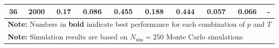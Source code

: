 \begin{landscape}
\begin{table}[p]
\begin{tabular}{cccccccccc}
	 36  & 2000 &        0.17        & 0.086                     &            0.455            &           0.188           &            0.444            & \textbf{0.057}         &          0.066           & -                 \\
	\hline
	\hline
    \multicolumn{10}{l}{\textbf{Note:} Numbers in \textbf{bold} inidicate best performance for each combination of $p$ and $T$} \\
    \multicolumn{10}{l}{\textbf{Note:} Simulation results are based on $N_\text{sim} = 250$ Monte Carlo simulations}
    \end{tabular}
    \end{table}
    \egroup
\end{landscape}
    